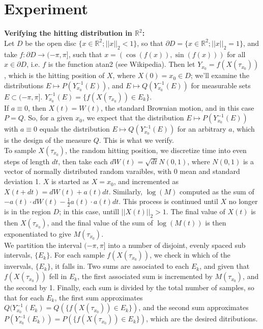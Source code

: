 \documentclass[12pt]{article}
\newcommand{\reals}[0] { \mathbb{R}}
\newcommand{\rarw}[0] { \rightarrow }
\begin{document}

\section*{Experiment}

{\bf Verifying the hitting distribution in $\reals^2$:}  \\

Let $D$ be the open disc $\{x \in \reals^2; ||x||_2 < 1 \}$, so that $\partial D = \{ x \in \reals^2; ||x||_2 = 1 \}$, and take $f: \partial D \rarw (-\pi,\pi]$, such that $x = (\cos(f(x)), \sin(f(x)))$ for all $x \in \partial D$, i.e. $f$ is the function atan2 (see Wikipedia). Then let $Y_{x_0} = f(X(\tau_{x_0}))$, which is the hitting position of $X$, where $X(0) = {x_0} \in D$; we'll examine the distributions $E \mapsto P(Y_{x_0}^{-1}(E))$, and $E \mapsto Q(Y_{x_0}^{-1}(E))$ for measurable sets $E \subset (-\pi,\pi]$. $Y_{x_0}^{-1}(E) = \{ f(X(\tau_{x_0})) \in E_k\}$.\\

If $a \equiv 0$, then $X(t) = W(t)$, the standard Brownian motion, and in this case $P = Q$. So, for a given $x_0$, we expect that the distribution $E \mapsto P(Y_{x_0}^{-1}(E))$ with $a \equiv 0$ equals the distribution $E \mapsto Q(Y_{x_0}^{-1}(E))$ for an arbitrary $a$, which is the design of the measure $Q$. This is what we verify. \\

To sample $X(\tau_{x_0})$, the random hitting position, we discretize time into even steps of length $dt$, then take each $dW(t)=\sqrt{dt} N(0,1)$, where $N(0,1)$ is a vector of normally distributed random varaibles, with 0 mean and standard deviation 1. $X$ is started as $X=x_0$, and incremented as $X(t+dt) = dW(t) + a(t)dt$. Similarly, $\log(M)$ computed as the sum of $-a(t) \cdot dW(t) - \frac{1}{2} a(t) \cdot a(t) dt$. This process is continued until $X$ no longer is in the region $D$; in this case, untill $||X(t)||_2 > 1$. The final value of $X(t)$ is then $X(\tau_{x_0})$, and the final value of the sum of $\log(M(t))$ is then exponentiated to give $M(\tau_{x_0})$. \\

We partition the interval $(-\pi,\pi]$ into a number of disjoint, evenly spaced sub intervals, $\{ E_k \}$. For each sample $f(X(\tau_{x_0}))$, we check in which of the invervals, $\{ E_k \}$, it falls in. Two sums are associated to each $E_k$, and given that $f(X(\tau_{x_0}))$ fell in $E_k$, the first associated sum is incremented by $M(\tau_{x_0})$, and the second by 1. Finally, each sum is divided by the total number of samples, so that for each $E_k$, the first sum approximates $Q(Y_{x_0}^{-1}(E_k) = Q(\{ f(X(\tau_{x_0})) \in E_k\})$, and the second sum approximates $P(Y_{x_0}^{-1}(E_k)) = P(\{ f(X(\tau_{x_0})) \in E_k\})$, which are the desired ditributions. \\
\end{document}
